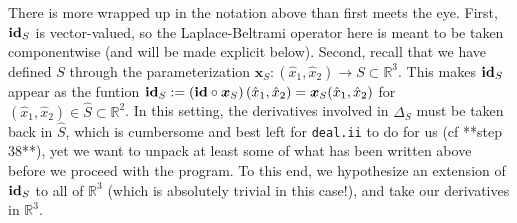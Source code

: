 \documentclass[10pt]{article}
\newcommand{\R}{\mathbb{R}}
\newcommand{\mbf}[1]{\boldsymbol{#1}}
\begin{document}
There is more wrapped up in the notation above than first meets the eye.
First, $\text{\bf id}_S$ is vector-valued, so the Laplace-Beltrami
operator here is meant to be taken componentwise (and will be made explicit
below). Second, recall that we have defined $S$ through the parameterization
$\mbf{x}_S : (\hat{x}_1, \hat{x}_2) \to S \subset \R^3$.  This makes $\text{\bf
id}_S$ appear as the funtion $\text{\bf id}_S :=  \left( \text{\bf id} \circ
\mbf{x}_S\right) (\hat{x}_1,\hat{x}_2) = \mbf{x}_S(\hat{x}_1,\hat{x}_2)$ for
$(\hat{x}_1,\hat{x}_2) \in \hat{S} \subset \R^2$.  In this setting, the
derivatives involved in $\Delta_S$ must be taken back in $\hat{S}$, which is
cumbersome and best left for \texttt{deal.ii} to do for us (cf **step 38**), yet we want to
unpack at least some of what has been written above before we proceed with the
program.  To this end, we hypothesize an extension of $\text{\bf id}_S$ to all
of $\R^3$ (which is absolutely trivial in this case!), and take our derivatives in
$\R^3$. 
\end{document}
